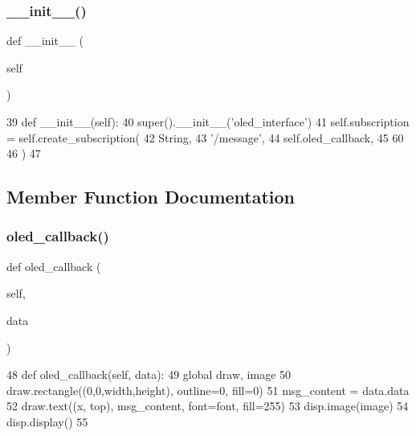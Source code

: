 \subsubsection{\texorpdfstring{\+\_\+\+\_\+init\+\_\+\+\_\+()}{\_\_init\_\_()}}
{\footnotesize\ttfamily def \+\_\+\+\_\+init\+\_\+\+\_\+ (\begin{DoxyParamCaption}\item[{}]{self }\end{DoxyParamCaption})}


\begin{DoxyCode}
39     \textcolor{keyword}{def }\_\_init\_\_(self):
40         super().\_\_init\_\_(\textcolor{stringliteral}{'oled\_interface'})
41         self.subscription = self.create\_subscription(
42                 String,
43                 \textcolor{stringliteral}{'/message'},
44                 self.oled\_callback,
45                 60
46         )
47 
\end{DoxyCode}


\subsection{Member Function Documentation}
\mbox{\label{classtoxic__hardware_1_1oled__interface_1_1OledInterface_a956e7ab59d12fa1dc3e975c2fba46296}} 
\subsubsection{\texorpdfstring{oled\+\_\+callback()}{oled\_callback()}}
{\footnotesize\ttfamily def oled\+\_\+callback (\begin{DoxyParamCaption}\item[{}]{self,  }\item[{}]{data }\end{DoxyParamCaption})}


\begin{DoxyCode}
48     \textcolor{keyword}{def }oled\_callback(self, data):
49         \textcolor{keyword}{global} draw, image
50         draw.rectangle((0,0,width,height), outline=0, fill=0)
51         msg\_content = data.data
52         draw.text((x, top), msg\_content,  font=font, fill=255)
53         disp.image(image)
54         disp.display()
55 
\end{DoxyCode}



